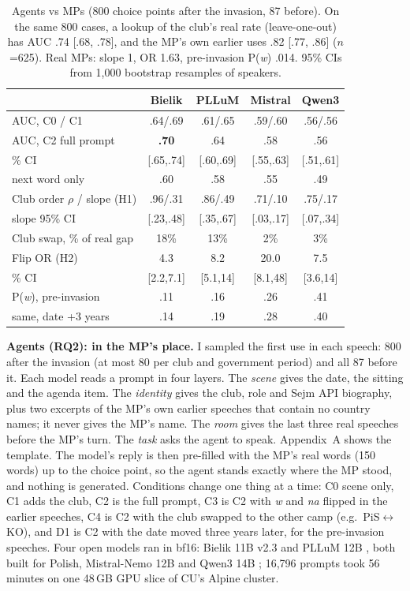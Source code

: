 \documentclass[10pt,twocolumn]{article}
\begin{document}
\begin{table}[t]\centering\small\setlength{\tabcolsep}{2.4pt}
\begin{tabular}{@{}lcccc@{}}\toprule
 & Bielik & PLLuM & Mistral & Qwen3 \\ \midrule
AUC, C0 / C1 & .64/.69 & .61/.65 & .59/.60 & .56/.56 \\
AUC, C2 full prompt & \textbf{.70} & .64 & .58 & .56 \\
\quad 95\% CI & [.65,.74] & [.60,.69] & [.55,.63] & [.51,.61] \\
\quad next word only & .60 & .58 & .55 & .49 \\ \midrule
Club order $\rho$ / slope (H1) & .96/.31 & .86/.49 & .71/.10 & .75/.17 \\
\quad slope 95\% CI & [.23,.48] & [.35,.67] & [.03,.17] & [.07,.34] \\
Club swap, \% of real gap & 18\% & 13\% & 2\% & 3\% \\
Flip OR (H2) & 4.3 & 8.2 & 20.0 & 7.5 \\
\quad 95\% CI & [2.2,7.1] & [5.1,14] & [8.1,48] & [3.6,14] \\
P(\emph{w}), pre-invasion & .11 & .16 & .26 & .41 \\
\quad same, date +3 years & .14 & .19 & .28 & .40 \\ \bottomrule
\end{tabular}
\caption{Agents vs MPs (800 choice points after the invasion, 87 before). On the same 800 cases, a lookup of the club's real rate (leave-one-out) has AUC .74 [.68, .78], and the MP's own earlier uses .82 [.77, .86] ($n$=625). Real MPs: slope 1, OR 1.63, pre-invasion P(\emph{w}) .014. 95\% CIs from 1,000 bootstrap resamples of speakers.}
\end{table}

\textbf{Agents (RQ2): in the MP's place.} I sampled the first use in each speech: 800 after the invasion (at most 80 per club and government period) and all 87 before it. Each model reads a prompt in four layers. The \emph{scene} gives the date, the sitting and the agenda item. The \emph{identity} gives the club, role and Sejm API biography, plus two excerpts of the MP's own earlier speeches that contain no country names; it never gives the MP's name. The \emph{room} gives the last three real speeches before the MP's turn. The \emph{task} asks the agent to speak. Appendix~A shows the template. The model's reply is then pre-filled with the MP's real words (150 words) up to the choice point, so the agent stands exactly where the MP stood, and nothing is generated. Conditions change one thing at a time: C0 scene only, C1 adds the club, C2 is the full prompt, C3 is C2 with \emph{w} and \emph{na} flipped in the earlier speeches, C4 is C2 with the club swapped to the other camp (e.g.\ PiS$\leftrightarrow$KO), and D1 is C2 with the date moved three years later, for the pre-invasion speeches. Four open models ran in bf16: Bielik 11B v2.3 \citep{ociepa2025} and PLLuM 12B \citep{kocon2025}, both built for Polish, Mistral-Nemo 12B \citep{mistral2024} and Qwen3 14B \citep{qwen2025}; 16,796 prompts took 56 minutes on one 48\,GB GPU slice of CU's Alpine cluster.
\end{document}
